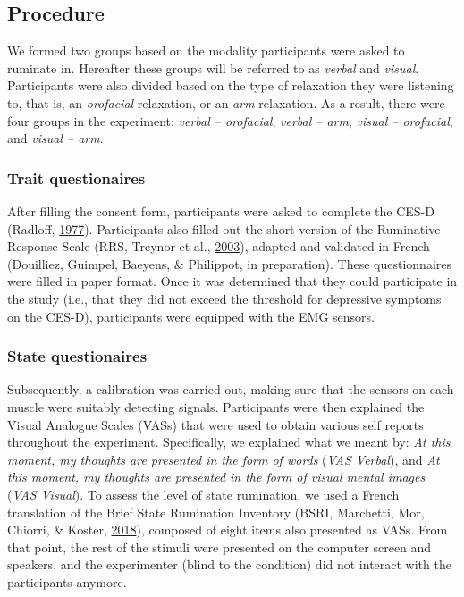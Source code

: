 \documentclass[a4paper,12pt,twoside,openright,oldfontcommands]{memoir}
\begin{document}
\hypertarget{procedure-1}{%
\subsection{Procedure}\label{procedure-1}}

We formed two groups based on the modality participants were asked to ruminate in. Hereafter these groups will be referred to as \emph{verbal} and \emph{visual}. Participants were also divided based on the type of relaxation they were listening to, that is, an \emph{orofacial} relaxation, or an \emph{arm} relaxation. As a result, there were four groups in the experiment: \emph{verbal -- orofacial}, \emph{verbal -- arm}, \emph{visual -- orofacial}, and \emph{visual -- arm}.

\hypertarget{trait-questionaires}{%
\subsubsection{Trait questionaires}\label{trait-questionaires}}

After filling the consent form, participants were asked to complete the CES-D (Radloff, \protect\hyperlink{ref-radloff_ces-d_1977}{1977}). Participants also filled out the short version of the Ruminative Response Scale (RRS, Treynor et al., \protect\hyperlink{ref-treynor_rumination_2003}{2003}), adapted and validated in French (Douilliez, Guimpel, Baeyens, \& Philippot, in preparation). These questionnaires were filled in paper format. Once it was determined that they could participate in the study (i.e., that they did not exceed the threshold for depressive symptoms on the CES-D), participants were equipped with the EMG sensors.

\hypertarget{state-questionaires}{%
\subsubsection{State questionaires}\label{state-questionaires}}

Subsequently, a calibration was carried out, making sure that the sensors on each muscle were suitably detecting signals. Participants were then explained the Visual Analogue Scales (VASs) that were used to obtain various self reports throughout the experiment. Specifically, we explained what we meant by: \emph{At this moment, my thoughts are presented in the form of words} (\emph{VAS Verbal}), and \emph{At this moment, my thoughts are presented in the form of visual mental images} (\emph{VAS Visual}). To assess the level of state rumination, we used a French translation of the Brief State Rumination Inventory (BSRI, Marchetti, Mor, Chiorri, \& Koster, \protect\hyperlink{ref-marchetti_brief_2018}{2018}), composed of eight items also presented as VASs. From that point, the rest of the stimuli were presented on the computer screen and speakers, and the experimenter (blind to the condition) did not interact with the participants anymore.
\end{document}
